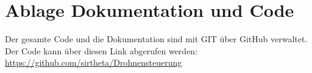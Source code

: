 \section{Ablage Dokumentation und Code}
Der gesamte Code und die Dokumentation sind mit GIT über GitHub verwaltet.\\

Der Code kann über diesen Link abgerufen werden:\\
\url{https://github.com/sirtheta/Drohnensteuerung}
